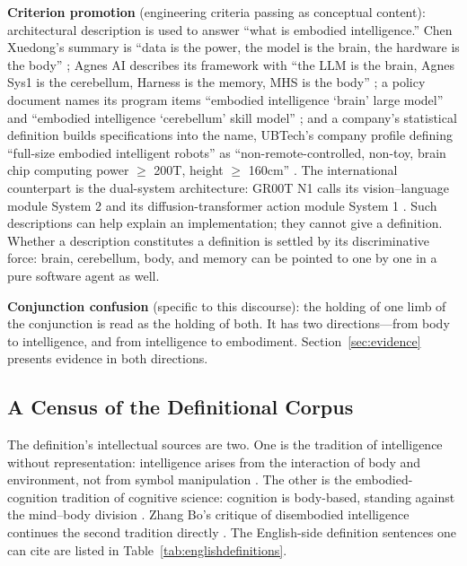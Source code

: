 \documentclass[10pt]{article}
\begin{document}
\textbf{Criterion promotion} (engineering criteria passing as conceptual content): architectural description is used to answer ``what is embodied intelligence.'' Chen Xuedong's summary is ``data is the power, the model is the brain, the hardware is the body'' \cite{chenxd2026}; Agnes AI describes its framework with ``the LLM is the brain, Agnes Sys1 is the cerebellum, Harness is the memory, MHS is the body'' \cite{agnesrepo2026,agnestr2026}; a policy document names its program items ``embodied intelligence `brain' large model'' and ``embodied intelligence `cerebellum' skill model'' \cite{beijing2025}; and a company's statistical definition builds specifications into the name, UBTech's company profile defining ``full-size embodied intelligent robots'' as ``non-remote-controlled, non-toy, brain chip computing power $\ge$ 200T, height $\ge$ 160cm'' \cite{ubtech}. The international counterpart is the dual-system architecture: GR00T N1 calls its vision--language module System 2 and its diffusion-transformer action module System 1 \cite{nvidiagroot2025}. Such descriptions can help explain an implementation; they cannot give a definition. Whether a description constitutes a definition is settled by its discriminative force: brain, cerebellum, body, and memory can be pointed to one by one in a pure software agent as well.

\textbf{Conjunction confusion} (specific to this discourse): the holding of one limb of the conjunction is read as the holding of both. It has two directions---from body to intelligence, and from intelligence to embodiment. Section~\ref{sec:evidence} presents evidence in both directions.

\subsection{A Census of the Definitional Corpus}\label{sec:corpus}

The definition's intellectual sources are two. One is the tradition of intelligence without representation: intelligence arises from the interaction of body and environment, not from symbol manipulation \cite{brooks1991,pfeifer2006}. The other is the embodied-cognition tradition of cognitive science: cognition is body-based, standing against the mind--body division \cite{varela1991,dreyfus1992,newen2018,shapiro2026}. Zhang Bo's critique of disembodied intelligence continues the second tradition directly \cite{zhangbo2025}. The English-side definition sentences one can cite are listed in Table~\ref{tab:englishdefinitions}.
\end{document}
